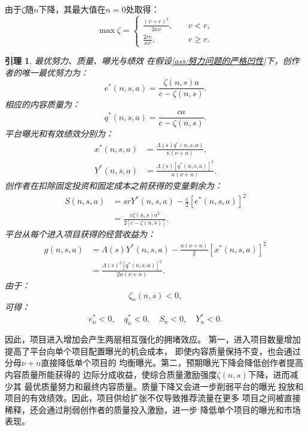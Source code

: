 \documentclass[UTF8, a4paper, 12pt, fontset=fandol]{ctexart}
\newtheorem{lemma}[theorem]{引理}
\theoremstyle{definition}
\theoremstyle{remark}
\begin{document}
由于$\zeta$随$n$下降，其最大值在$n=0$处取得：
\begin{equation*}
  \max \zeta =
  \begin{cases}
    \frac{(v+r)^2}{2\kappa \nu},&\quad v<r,\\
    \frac{2rv}{\kappa \nu},&\quad v \ge r.
  \end{cases}
\end{equation*}

\begin{lemma}{最优努力、质量、曝光与绩效}
  在假设\ref{ass:努力问题的严格凹性}下，创作者的唯一最优努力为：
  \begin{equation*}
    e^*(n,s,a) = \frac{\zeta(n,s)a}{c-\zeta(n,s)}.
  \end{equation*}
  相应的内容质量为：
  \begin{equation*}
    q^*(n,s,a)=\frac{ca}{c-\zeta(n,s)}.
  \end{equation*}
  平台曝光和有效绩效分别为：
  \begin{align*}
    x^*(n,s,a)&=\frac{\Lambda(s)q^*(n,s,a)}{\kappa(\nu+n)},\\
    Y^*(n,s,a)&=\frac{\Lambda(s)[q^*(n,s,a)]^2}{\kappa(\nu+n)}.
  \end{align*}
  创作者在扣除固定投资和固定成本之前获得的变量剩余为：
  \begin{align*}
    S(n,s,a) &= sr Y^*(n,s,a)-\frac{c}{2}[e^*(n,s,a)]^2\\
    &= \frac{c\zeta(n,s)a^2}{2[c-\zeta(n,s)]}.
  \end{align*}
  平台从每个进入项目获得的经营收益为：
  \begin{align*}
    g(n,s,a) &= \Lambda(s)Y^*(n,s,a)-\frac{\kappa(\nu+n)}{2}[x^*(n,s,a)]^2\\
    &=\frac{\Lambda(s)^2[q^*(n,s,a)]^2}{2\kappa(\nu+n)}.
  \end{align*}
  由于：
  \begin{equation*}
    \zeta_n(n,s)<0,
  \end{equation*}
  可得：
  \begin{equation*}
    e_n^*<0,\quad q_n^*<0,\quad S_n<0,\quad Y_n^*<0.
  \end{equation*}
\end{lemma}
因此，项目进入增加会产生两层相互强化的拥堵效应。
第一，进入项目数量增加提高了平台向单个项目配置曝光的机会成本，
即使内容质量保持不变，也会通过分母$\nu+n$直接降低单个项目的
均衡曝光。第二，预期曝光下降会降低创作者提高内容质量所能获得的
边际分成收益，使综合质量激励强度$\zeta(n,s)$下降，进而减少其
最优质量努力和最终内容质量。质量下降又会进一步削弱平台的曝光
投放和项目的有效绩效。因此，项目供给扩张不仅导致推荐流量在更多
项目之间被直接稀释，还会通过削弱创作者的质量投入激励，进一步
降低单个项目的曝光和市场表现。
\end{document}
